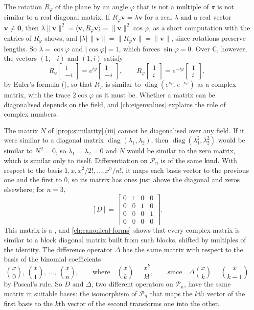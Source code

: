 The rotation $R_\varphi$ of the plane by an angle $\varphi$ that is not a multiple of $\pi$ is not similar to a real diagonal matrix. If $R_\varphi\mathbf v=\lambda\mathbf v$ for a real $\lambda$ and a real vector $\mathbf v\ne\mathbf 0$, then $\lambda\|\mathbf v\|^2=\langle\mathbf v,R_\varphi\mathbf v\rangle=\|\mathbf v\|^2\cos\varphi$, as a short computation with the entries of $R_\varphi$ shows, and $|\lambda|\,\|\mathbf v\|=\|R_\varphi\mathbf v\|=\|\mathbf v\|$, since rotations preserve lengths. So $\lambda=\cos\varphi$ and $|\cos\varphi|=1$, which forces $\sin\varphi=0$. Over $\mathbb C$, however, the vectors $(1,-i)$ and $(1,i)$ satisfy
\[
R_\varphi\begin{bmatrix}1\\-i\end{bmatrix}=e^{i\varphi}\begin{bmatrix}1\\-i\end{bmatrix},\qquad R_\varphi\begin{bmatrix}1\\i\end{bmatrix}=e^{-i\varphi}\begin{bmatrix}1\\i\end{bmatrix},
\]
by Euler's formula (), so that $R_\varphi$ is similar to $\operatorname{diag}(e^{i\varphi},e^{-i\varphi})$ as a complex matrix, with the trace $2\cos\varphi$ as it must be. Whether a matrix can be diagonalised depends on the field, and \cref{ch:eigenvalues} explains the role of complex numbers.

The matrix $N$ of \cref{prop:similarity}\,(iii) cannot be diagonalised over any field. If it were similar to a diagonal matrix $\operatorname{diag}(\lambda_1,\lambda_2)$, then $\operatorname{diag}(\lambda_1^2,\lambda_2^2)$ would be similar to $N^2=0$, so $\lambda_1=\lambda_2=0$ and $N$ would be similar to the zero matrix, which is similar only to itself. Differentiation on $\mathcal P_n$ is of the same kind. With respect to the basis $1,x,x^2/2!,\ldots,x^n/n!$, it maps each basis vector to the previous one and the first to $0$, so its matrix has ones just above the diagonal and zeros elsewhere; for $n=3$,
\[
[D]=\begin{bmatrix}0&1&0&0\\0&0&1&0\\0&0&0&1\\0&0&0&0\end{bmatrix}.
\]
This matrix is a , and \cref{ch:canonical-forms} shows that every complex matrix is similar to a block diagonal matrix built from such blocks, shifted by multiples of the identity. The difference operator $\Delta$ has the same matrix with respect to the basis of the binomial coefficients
\[
\binom x0,\ \binom x1,\ \ldots,\ \binom xn,\qquad\text{where}\quad\binom xk=\frac{x^{\underline k}}{k!},\qquad\text{since}\quad\Delta\binom xk=\binom x{k-1}
\]
by Pascal's rule. So $D$ and $\Delta$, two different operators on $\mathcal P_n$, have the same matrix in suitable bases: the isomorphism of $\mathcal P_n$ that maps the $k$th vector of the first basis to the $k$th vector of the second transforms one into the other.

